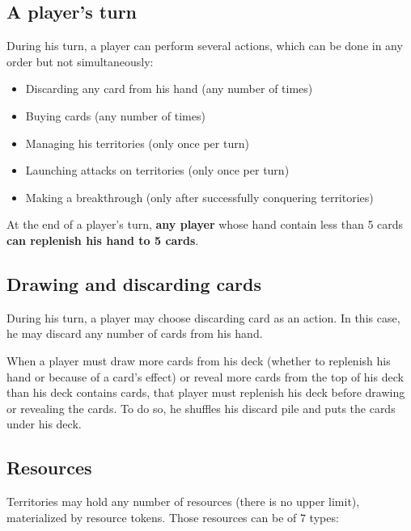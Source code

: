 \documentclass[a4paper]{article}
\begin{document}
  \subsection{A player's turn}

    \hspace{-1.5em} During his turn, a player can perform several actions,
    which can be done in any order but not simultaneously:
    \vspace{-1.3em}
    \begin{itemize}
        \item Discarding any card from his hand (any number of times)
        \item Buying cards (any number of times)
        \item Managing his territories (only once per turn)
        \item Launching attacks on territories (only once per turn)
        \item Making a breakthrough (only after successfully conquering territories)
    \end{itemize}
    
    \vspace{-0.7em}
    At the end of a player's turn, \textbf{any player} whose hand contain less than 5
    cards \textbf{can replenish his hand to 5 cards}.


  \subsection{Drawing and discarding cards}
    
    During his turn, a player may choose discarding card as an action.
    In this case, he may discard any number of cards from his hand.

    When a player must draw more cards from his deck
    (whether to replenish his hand or because of a card's effect)
    or reveal more cards from the top of his deck than his deck contains cards,
    that player must replenish his deck before drawing or revealing the cards.
    To do so, he shuffles his discard pile and puts the cards under his deck.


\newpage
  \subsection{Resources}
  
    Territories may hold any number of resources (there is no upper limit),
    materialized by resource tokens. Those resources can be of 7 types:
    
\end{document}
